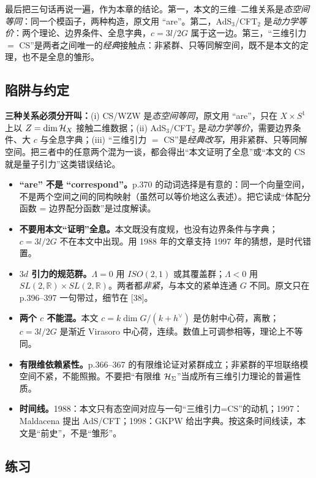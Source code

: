 最后把三句话再说一遍，作为本章的结论。第一，本文的三维--二维关系是\emph{态空间等同}：同一个模函子，两种构造，原文用 “are”。第二，AdS$_3$/CFT$_2$ 是\emph{动力学等价}：两个理论、边界条件、全息字典，$c=3l/2G$ 属于这一边。第三，“三维引力 $=$ CS”是两者之间唯一的\emph{经典}接触点：非紧群、只等同解空间，既不是本文的定理，也不是全息的雏形。

\subsection{陷阱与约定}

\begin{keypoint}
\textbf{三种关系必须分开叫：}(i) CS/WZW 是\emph{态空间等同}，原文用 “are”，只在 $X\times S^1$ 上以 $Z=\dim\mathcal{H}_X$ 接触二维数据；(ii) AdS$_3$/CFT$_2$ 是\emph{动力学等价}，需要边界条件、大 $c$ 与全息字典；(iii) “三维引力 $=$ CS”是\emph{经典改写}，用非紧群、只等同解空间。把三者中的任意两个混为一谈，都会得出“本文证明了全息”或“本文的 CS 就是量子引力”这类错误结论。
\end{keypoint}

\begin{itemize}[leftmargin=1.6em]
  \item \textbf{“are” 不是 “correspond”。}p.370 的动词选择是有意的：同一个向量空间，不是两个空间之间的同构映射（虽然可以等价地这么表述）。把它读成“体配分函数 = 边界配分函数”是过度解读。
  \item \textbf{不要用本文“证明”全息。}本文既没有度规，也没有边界条件与字典；$c=3l/2G$ 不在本文中出现。用 1988 年的文章支持 1997 年的猜想，是时代错置。
  \item \textbf{$3d$ 引力的规范群。}$\Lambda=0$ 用 $ISO(2,1)$ 或其覆盖群；$\Lambda<0$ 用 $SL(2,\mathbb{R})\times SL(2,\mathbb{R})$。两者都\emph{非紧}，与本文的紧单连通 $G$ 不同。原文只在 p.396--397 一句带过，细节在 [38]。
  \item \textbf{两个 $c$ 不能混。}本文 $c=k\dim G/(k+h^\vee)$ 是仿射中心荷，离散；$c=3l/2G$ 是渐近 Virasoro 中心荷，连续。数值上可调参相等，理论上不等同。
  \item \textbf{有限维依赖紧性。}p.366--367 的有限维论证对紧群成立；非紧群的平坦联络模空间不紧，不能照搬。不要把“有限维 $\mathcal{H}_\Sigma$”当成所有三维引力理论的普遍性质。
  \item \textbf{时间线。}1988：本文只有态空间对应与一句“三维引力=CS”的动机；1997：Maldacena 提出 AdS/CFT；1998：GKPW 给出字典。按这条时间线读，本文是“前史”，不是“雏形”。
\end{itemize}

\subsection{练习}

